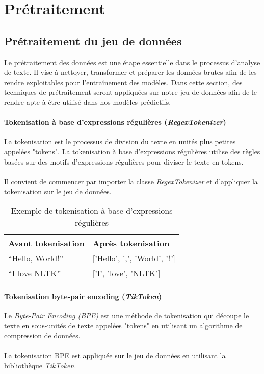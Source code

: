 \chapter{Prétraitement}

\section{Prétraitement du jeu de données}

Le prétraitement des données est une étape essentielle dans le processus d'analyse de texte. Il vise à nettoyer, transformer et préparer les données brutes afin de les rendre exploitables pour l'entraînement des modèles. Dans cette section, des techniques de prétraitement seront appliquées sur notre jeu de données afin de le rendre apte à être utilisé dans nos modèles prédictifs.

\subsubsection{Tokenisation à base d'expressions régulières (\textit{RegexTokenizer})}

La tokenisation est le processus de division du texte en unités plus petites appelées "tokens". La tokenisation à base d’expressions régulières utilise des règles basées sur des motifs d'expressions régulières pour diviser le texte en tokens. \\
\\
Il convient de commencer par importer la classe \textit{RegexTokenizer} et d'appliquer la tokenisation sur le jeu de données.

\begin{table}[h]
\centering
\begin{tabular}{|l|l|}
\hline
\textbf{Avant tokenisation} & \textbf{Après tokenisation} \\ \hline
``Hello, World!'' & ['Hello', ',', 'World', '!'] \\ \hline
``I love NLTK'' & ['I', 'love', 'NLTK'] \\ \hline
\end{tabular}
\caption{Exemple de tokenisation à base d'expressions régulières}
\end{table}

\subsubsection{Tokenisation byte-pair encoding (\textit{TikToken})}

Le \textit{Byte-Pair Encoding (BPE)} est une méthode de tokenisation qui découpe le texte en sous-unités de texte appelées "tokens" en utilisant un algorithme de compression de données.
\\
\\
La tokenisation BPE est appliquée sur le jeu de données en utilisant la bibliothèque \textit{TikToken}.

